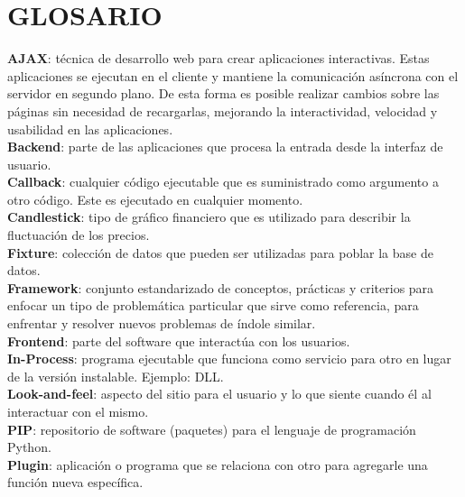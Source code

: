 \chapter*{GLOSARIO}

\textbf{AJAX}:  técnica de desarrollo web para crear aplicaciones interactivas. Estas aplicaciones se ejecutan en el cliente y mantiene la comunicación asíncrona con el servidor en segundo plano. De esta forma es posible realizar cambios sobre las páginas sin necesidad de recargarlas, mejorando la interactividad, velocidad y usabilidad en las aplicaciones.\\

\textbf{Backend}: parte de las aplicaciones que procesa la entrada desde la interfaz de usuario.\\

\textbf{Callback}:  cualquier código ejecutable que es suministrado como argumento a otro código. Este es ejecutado en cualquier momento.\\

\textbf{Candlestick}: tipo de gráfico financiero que es utilizado para describir la fluctuación de los precios. \\

\textbf{Fixture}: colección de datos que pueden ser utilizadas para poblar la base de datos.\\

\textbf{Framework}: conjunto estandarizado de conceptos, prácticas y criterios para enfocar un tipo de problemática particular que sirve como referencia, para enfrentar y resolver nuevos problemas de índole similar.\\

\textbf{Frontend}:  parte del software que interactúa con los usuarios.\\

\textbf{In-Process}: programa ejecutable que funciona como servicio para otro en lugar de la versión instalable. Ejemplo: DLL.\\

\textbf{Look-and-feel}: aspecto del sitio para el usuario y lo que siente cuando él al interactuar con el mismo.\\

\textbf{PIP}: repositorio de software (paquetes) para el lenguaje de programación Python.\\

\textbf{Plugin}: aplicación o programa que se relaciona con otro para agregarle una función nueva específica.\\

